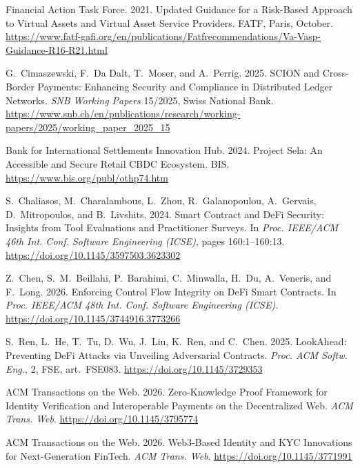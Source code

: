 \documentclass[12pt,a4paper]{report}
\begin{document}
{\begin{enumerate}[label={[\arabic*]}]
\item Financial Action Task Force. 2021. Updated Guidance for a Risk-Based Approach to Virtual Assets and Virtual Asset Service Providers. FATF, Paris, October. \url{https://www.fatf-gafi.org/en/publications/Fatfrecommendations/Va-Vasp-Guidance-R16-R21.html}

\item G.~Cimaszewski, F.~Da Dalt, T.~Moser, and A.~Perrig. 2025. SCION and Cross-Border Payments: Enhancing Security and Compliance in Distributed Ledger Networks. \emph{SNB Working Papers} 15/2025, Swiss National Bank. \url{https://www.snb.ch/en/publications/research/working-papers/2025/working_paper_2025_15}

\item Bank for International Settlements Innovation Hub. 2024. Project Sela: An Accessible and Secure Retail CBDC Ecosystem. BIS. \url{https://www.bis.org/publ/othp74.htm}

\item S.~Chaliasos, M.~Charalambous, L.~Zhou, R.~Galanopoulou, A.~Gervais, D.~Mitropoulos, and B.~Livshits. 2024. Smart Contract and DeFi Security: Insights from Tool Evaluations and Practitioner Surveys. In \emph{Proc. IEEE/ACM 46th Int. Conf. Software Engineering (ICSE)}, pages 160:1--160:13. \url{https://doi.org/10.1145/3597503.3623302}

\item Z.~Chen, S.~M.~Beillahi, P.~Barahimi, C.~Minwalla, H.~Du, A.~Veneris, and F.~Long. 2026. Enforcing Control Flow Integrity on DeFi Smart Contracts. In \emph{Proc. IEEE/ACM 48th Int. Conf. Software Engineering (ICSE)}. \url{https://doi.org/10.1145/3744916.3773266}

\item S.~Ren, L.~He, T.~Tu, D.~Wu, J.~Liu, K.~Ren, and C.~Chen. 2025. LookAhead: Preventing DeFi Attacks via Unveiling Adversarial Contracts. \emph{Proc. ACM Softw. Eng.}, 2, FSE, art.~FSE083. \url{https://doi.org/10.1145/3729353}

\item ACM Transactions on the Web. 2026. Zero-Knowledge Proof Framework for Identity Verification and Interoperable Payments on the Decentralized Web. \emph{ACM Trans. Web}. \url{https://doi.org/10.1145/3795774}

\item ACM Transactions on the Web. 2026. Web3-Based Identity and KYC Innovations for Next-Generation FinTech. \emph{ACM Trans. Web}. \url{https://doi.org/10.1145/3771991}


\end{enumerate}}
\end{document}
